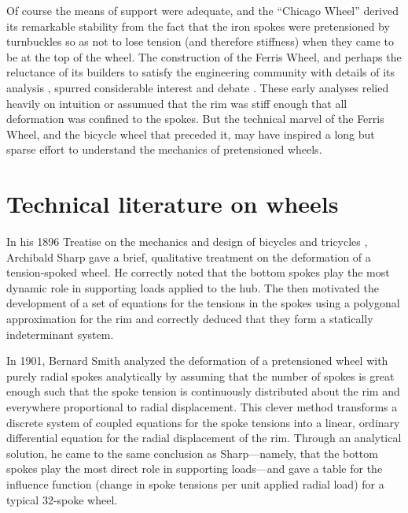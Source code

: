\documentclass[../thesis.tex]{subfiles}
\begin{document}
Of course the means of support were adequate, and the ``Chicago Wheel'' derived its remarkable stability from the fact that the iron spokes were pretensioned by turnbuckles so as not to lose tension (and therefore stiffness) when they came to be at the top of the wheel. The construction of the Ferris Wheel, and perhaps the reluctance of its builders to satisfy the engineering community with details of its analysis \cite{AmericanRailwayJournal}, spurred considerable interest and debate \cite{AmericanRailwayJournal2,Searles}. These early analyses relied heavily on intuition or assumued that the rim was stiff enough that all deformation was confined to the spokes. But the technical marvel of the Ferris Wheel, and the bicycle wheel that preceded it, may have inspired a long but sparse effort to understand the mechanics of pretensioned wheels.


\section{Technical literature on wheels}




In his 1896 Treatise on the mechanics and design of bicycles and tricycles \cite{Sharp}, Archibald Sharp gave a brief, qualitative treatment on the deformation of a tension-spoked wheel. He correctly noted that the bottom spokes play the most dynamic role in supporting loads applied to the hub. The then motivated the development of a set of equations for the tensions in the spokes using a polygonal approximation for the rim and correctly deduced that they form a statically indeterminant system.

In 1901, Bernard Smith \cite{Smith} analyzed the deformation of a pretensioned wheel with purely radial spokes analytically by assuming that the number of spokes is great enough such that the spoke tension is continuously distributed about the rim and everywhere proportional to radial displacement. This clever method transforms a discrete system of coupled equations for the spoke tensions into a linear, ordinary differential equation for the radial displacement of the rim. Through an analytical solution, he came to the same conclusion as Sharp---namely, that the bottom spokes play the most direct role in supporting loads---and gave a table for the influence function (change in spoke tensions per unit applied radial load) for a typical 32-spoke wheel.
\end{document}
